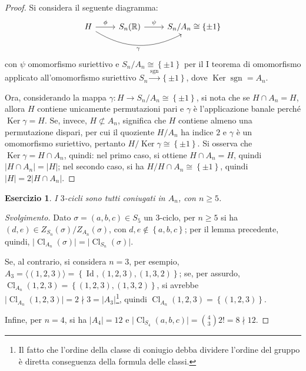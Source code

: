 \documentclass[11pt]{article}
\theoremstyle{style}
\newtheorem{esercizio}{Esercizio}[section]
\newenvironment{svolgimento}{\renewcommand\qedsymbol{$\blacksquare$}\begin{proof}[Svolgimento]}{\end{proof}}
\numberwithin{equation}{subsection}
\begin{document}
	\begin{proof}
		Si considera il seguente diagramma:
	\[
\begin{tikzcd}
H \arrow[r, "\phi "] 
    \arrow[rr, bend right=30, "{\gamma}"'] & 
S_n(\mathbb{R}) \arrow[r, "\psi  "] & S_n / A_n \cong \left\{ \pm 1 \right\} 
\end{tikzcd}
\]
con $\psi  $ omomorfismo suriettivo e $S_n / A_n \cong \left\{ \pm 1 \right\} $ per il I teorema di omomorfismo applicato all'omomorfismo suriettivo $S_n \stackrel{\operatorname{sgn} }{\longrightarrow} \left\{ \pm 1 \right\} $, dove $\operatorname{Ker} \operatorname{sgn}  = A_n$. 

Ora, considerando la mappa $\gamma : H \to S_n / A_n \cong \left\{ \pm 1 \right\} $, si nota che se $H\cap A_n = H$, allora $H$ contiene unicamente permutazioni pari e $\gamma$ \`e l'applicazione banale perch\'e $\operatorname{Ker} \gamma = H$.
Se, invece, $H \not\subset A_n$, significa che $H$ contiene almeno una permutazione dispari, per cui il quoziente $H / A_n$ ha indice $2$ e $\gamma$ \`e un omomorfismo suriettivo, pertanto $H / \operatorname{Ker} \gamma \cong \left\{ \pm 1 \right\} $.
Si osserva che $\operatorname{Ker} \gamma = H \cap A_n$, quindi: nel primo caso, si ottiene $H\cap A_n= H$, quindi $\lvert H\cap A_n \rvert = \lvert H \rvert $; nel secondo caso, si ha $H / H\cap A_n \cong \left\{ \pm 1 \right\} $, quindi $\lvert H \rvert = 2 \lvert H \cap A_n \rvert $.
	\end{proof}
\begin{esercizio}
I $3$-cicli sono tutti coniugati in $A_n$, con $n\ge 5$.
\end{esercizio}
\begin{svolgimento}
	Dato $\sigma =(a,b,c) \in S_5$ un $3$-ciclo, per $n\ge 5$ si ha $(d,e) \in Z_{S_n} (\sigma ) / Z_{A_n} (\sigma )$, con $d,e \not \in \left\{ a,b,c \right\} $; per il lemma precedente, quindi, $\lvert \operatorname{Cl} _{A_n} (\sigma ) \rvert = \lvert \operatorname{Cl} _{S_n} (\sigma  )\rvert $.

	Se, al contrario, si considera $n=3$, per esempio, $A_3 = \langle (1,2,3) \rangle=\left\{ \operatorname{Id} , (1,2,3), (1,3,2) \right\} $; se, per assurdo, $\operatorname{Cl} _{A_n} (1,2,3) = \left\{ (1,2,3),(1,3,2) \right\} $, si avrebbe $\lvert \operatorname{Cl} _{A_n} (1,2,3) \rvert = 2 \nmid 3 = \lvert A_3 \rvert $\footnote{Il fatto che l'ordine della classe di coniugio debba dividere l'ordine del gruppo \`e diretta conseguenza della formula delle classi.}, quindi $\operatorname{Cl} _{A_n} (1,2,3) = \left\{ (1,2,3) \right\} $.

	Infine, per $n=4$, si ha $\lvert A_4 \rvert =12$ e $\lvert \operatorname{Cl} _{S_4} (a,b,c) \rvert = \binom{4}{3}2! = 8  \nmid  12$.
\end{svolgimento}
\end{document}
